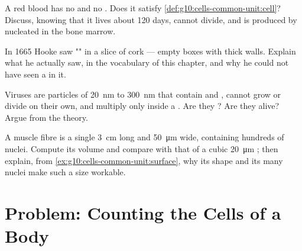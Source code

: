 \begin{exercise}[$\star\star\star$]\label{exo:g10:cells-common-unit:12}
A red blood  has no  and no . Does it satisfy
\cref{def:g10:cells-common-unit:cell}? Discuss, knowing that it lives
about 120 days, cannot divide, and is produced by nucleated  in
the bone marrow.
\end{exercise}

\begin{exercise}[$\star\star\star$]\label{exo:g10:cells-common-unit:13}
In 1665 Hooke saw "" in a slice of cork --- empty boxes with thick
walls. Explain what he actually saw, in the vocabulary of this chapter,
and why he could not have seen a  in it.
\end{exercise}

\begin{exercise}[$\star\star\star$]\label{exo:g10:cells-common-unit:14}
Viruses are particles of \qty{20}{nm} to \qty{300}{nm} that contain
 and , cannot grow or divide on their own, and
multiply only inside a . Are they ? Are they alive? Argue
from the  theory.
\end{exercise}

\begin{exercise}[$\star\star\star$]\label{exo:g10:cells-common-unit:15}
A muscle fibre is a single  \qty{3}{cm} long and \qty{50}{\micro m}
wide, containing hundreds of nuclei. Compute its volume and compare
with that of a cubic \qty{20}{\micro m} ; then explain, from
\cref{ex:g10:cells-common-unit:surface}, why its shape and its many
nuclei make such a size workable.
\end{exercise}

\section{Problem: Counting the Cells of a Body}

